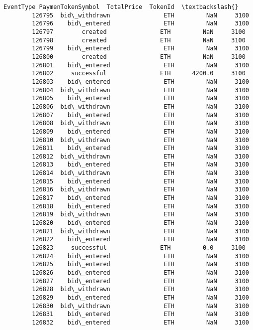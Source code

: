 \documentclass[11pt]{article}
\begin{document}
\begin{Verbatim}[commandchars=\\\{\}]
                    EventType PaymenTokenSymbol  TotalPrice  TokenId  \textbackslash{}
        126795  bid\_withdrawn               ETH         NaN     3100   
        126796    bid\_entered               ETH         NaN     3100   
        126797        created               ETH         NaN     3100   
        126798        created               ETH         NaN     3100   
        126799    bid\_entered               ETH         NaN     3100   
        126800        created               ETH         NaN     3100   
        126801    bid\_entered               ETH         NaN     3100   
        126802     successful               ETH      4200.0     3100   
        126803    bid\_entered               ETH         NaN     3100   
        126804  bid\_withdrawn               ETH         NaN     3100   
        126805    bid\_entered               ETH         NaN     3100   
        126806  bid\_withdrawn               ETH         NaN     3100   
        126807    bid\_entered               ETH         NaN     3100   
        126808  bid\_withdrawn               ETH         NaN     3100   
        126809    bid\_entered               ETH         NaN     3100   
        126810  bid\_withdrawn               ETH         NaN     3100   
        126811    bid\_entered               ETH         NaN     3100   
        126812  bid\_withdrawn               ETH         NaN     3100   
        126813    bid\_entered               ETH         NaN     3100   
        126814  bid\_withdrawn               ETH         NaN     3100   
        126815    bid\_entered               ETH         NaN     3100   
        126816  bid\_withdrawn               ETH         NaN     3100   
        126817    bid\_entered               ETH         NaN     3100   
        126818    bid\_entered               ETH         NaN     3100   
        126819  bid\_withdrawn               ETH         NaN     3100   
        126820    bid\_entered               ETH         NaN     3100   
        126821  bid\_withdrawn               ETH         NaN     3100   
        126822    bid\_entered               ETH         NaN     3100   
        126823     successful               ETH         0.0     3100   
        126824    bid\_entered               ETH         NaN     3100   
        126825    bid\_entered               ETH         NaN     3100   
        126826    bid\_entered               ETH         NaN     3100   
        126827    bid\_entered               ETH         NaN     3100   
        126828  bid\_withdrawn               ETH         NaN     3100   
        126829    bid\_entered               ETH         NaN     3100   
        126830  bid\_withdrawn               ETH         NaN     3100   
        126831    bid\_entered               ETH         NaN     3100   
        126832    bid\_entered               ETH         NaN     3100   
        

\end{Verbatim}
\end{document}
